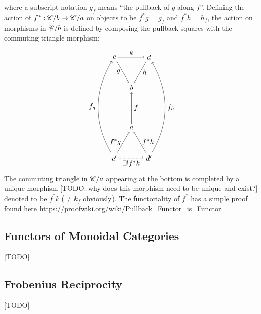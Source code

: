 \documentclass[12pt]{article}
\theoremstyle{definition}
\theoremstyle{remark}
\begin{document}
where a subscript notation $g_{f}$ means ``the pullback of $g$ along $f$''. Defining the action of $f^{\ast} : \mathscr{C} / b \to \mathscr{C} / a$ on objects to be $f^{\ast}g = g_{f}$ and $f^{\ast}h = h_{f}$, the action on morphisms in $\mathscr{C} / b$ is defined by composing the pullback squares with the commuting triangle morphism:
\[
    \begin{tikzpicture}
        \begin{scope}[shift={(0,+2)}]
            \draw (150:1) node(t1){$c$};
            \draw ( 30:1) node(t2){$d$};
            \draw (270:1) node(t3){$b$};

            \draw[->] (t1) to node[below,left ]{$g$}  (t3);
            \draw[->] (t2) to node[below,right]{$h$} (t3);
            \draw[->] (t1) to node[above]{$k$} (t2);
        \end{scope}

        \begin{scope}[shift={(0,-2)}]
            \draw (210:1) node(b1){$c'$};
            \draw (330:1) node(b2){$d'$};
            \draw ( 90:1) node(b3){$a$};

            \draw[->] (b1) to node[below,left ]{$f^{\ast}g$} (b3);
            \draw[->] (b2) to node[below,right]{$f^{\ast}h$} (b3);
            \draw[dashed, ->] (b1) to node[below]{$\exists! f^{\ast}k$} (b2);
        \end{scope}
        \draw[->] (b1) to[out=+120, in=-120] node[left ]{$f_{g}$} (t1);
        \draw[->] (b2) to[out=+ 60, in=- 60] node[right]{$f_{h}$} (t2);
        \draw[->] (b3) to node[right]{$f$} (t3);
    \end{tikzpicture}
\]
The commuting triangle in $\mathscr{C} / a$ appearing at the bottom is completed by a unique morphism \textcolor{red!50!black}{[TODO: why does this morphism need to be unique and exist?]} denoted to be $f^{\ast}k$ ($\neq k_{f}$ obviously). The functoriality of $f^{\ast}$ has a simple proof found here \url{https://proofwiki.org/wiki/Pullback_Functor_is_Functor}.

\subsection{Functors of Monoidal Categories}

\textcolor{red!50!black}{[TODO]}

\subsection{Frobenius Reciprocity}

\textcolor{red!50!black}{[TODO]}



\printbibliography
\end{document}
